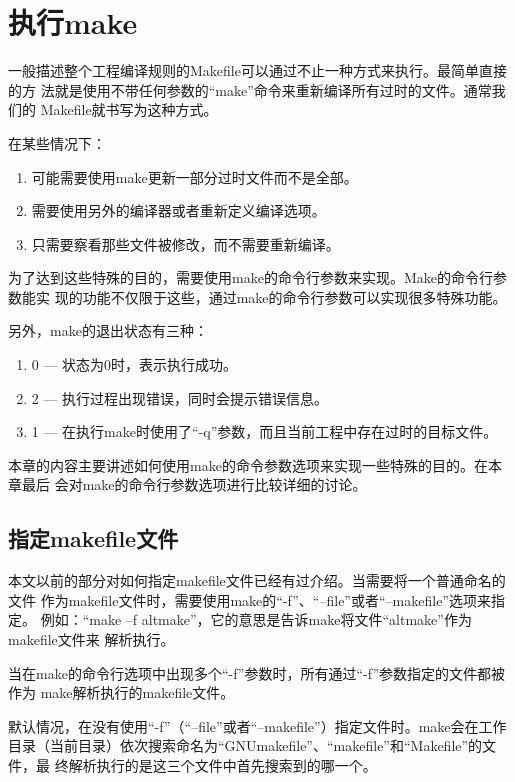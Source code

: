 ﻿\chapter{执行make}
一般描述整个工程编译规则的Makefile可以通过不止一种方式来执行。最简单直接的方
法就是使用不带任何参数的“make”命令来重新编译所有过时的文件。通常我们的
Makefile就书写为这种方式。

在某些情况下：
\begin{enumerate}
\itemsep=4pt \parskip=0pt
\item  可能需要使用make更新一部分过时文件而不是全部。

\item 需要使用另外的编译器或者重新定义编译选项。

\item 只需要察看那些文件被修改，而不需要重新编译。
\end{enumerate}

为了达到这些特殊的目的，需要使用make的命令行参数来实现。Make的命令行参数能实
现的功能不仅限于这些，通过make的命令行参数可以实现很多特殊功能。

另外，make的退出状态有三种：
\begin{enumerate}
\itemsep=4pt \parskip=0pt
\item[]  0 — 状态为0时，表示执行成功。

\item[] 2 — 执行过程出现错误，同时会提示错误信息。

\item[] 1 — 在执行make时使用了“-q”参数，而且当前工程中存在过时的目标文件。
\end{enumerate}

本章的内容主要讲述如何使用make的命令参数选项来实现一些特殊的目的。在本章最后
会对make的命令行参数选项进行比较详细的讨论。

\section{指定makefile文件}
本文以前的部分对如何指定makefile文件已经有过介绍。当需要将一个普通命名的文件
作为makefile文件时，需要使用make的“-f”、“--file”或者“--makefile”选项来指定。
例如：“make –f altmake”，它的意思是告诉make将文件“altmake”作为makefile文件来
解析执行。

当在make的命令行选项中出现多个“-f”参数时，所有通过“-f”参数指定的文件都被作为
make解析执行的makefile文件。

默认情况，在没有使用“-f”（“--file”或者“--makefile”）指定文件时。make会在工作
目录（当前目录）依次搜索命名为“GNUmakefile”、“makefile”和“Makefile”的文件，最
终解析执行的是这三个文件中首先搜索到的哪一个。

